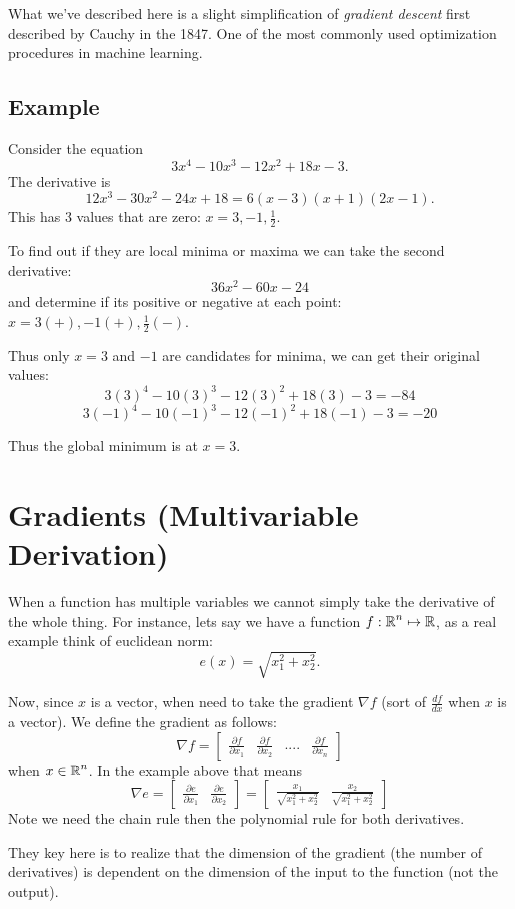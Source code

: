 What we've described here is a slight simplification of \emph{gradient descent} first described by Cauchy in the 1847. 
One of the most commonly used optimization procedures in machine learning. 

\subsection{Example}
Consider the equation \[3x^4-10x^3-12x^2+18x-3.\]
The derivative is \[12x^3-30x^2-24x+18=6(x-3)(x+1)(2x-1).\]
This has 3 values that are zero: $x=3,-1,\frac{1}{2}.$


To find out if they are local minima or maxima we can take the second derivative: 
\[36x^2-60x-24\] 
and determine if its positive or negative at each point: 
$x=3 (+),-1 (+),\frac{1}{2}(-).$

Thus only $x=3$ and $-1$ are candidates for minima, 
we can get their original values:
\[3(3)^4-10(3)^3-12(3)^2+18(3)-3=-84\]
\[3(-1)^4-10(-1)^3-12(-1)^2+18(-1)-3=-20\]

Thus the global minimum is at $x=3$.
\section{Gradients (Multivariable Derivation)}
When a function has multiple variables we cannot simply take the derivative of the whole thing. 
For instance, lets say we have a function $f:\operatorname{\mathbb{R}}^n\mapsto\operatorname{\mathbb{R}}$, 
as a real example think of euclidean norm: 
\[e(x) = \sqrt{x_1^2+x_2^2}.\]

Now, since $x$ is a vector, when need to take the gradient $\nabla f$ (sort of $\frac{df}{dx}$ when $x$ is a vector). 
We define the gradient as follows:
\[\nabla f = \begin{bmatrix}\frac{\partial f}{\partial x_1}&\frac{\partial f}{\partial x_2}&....&\frac{\partial f}{\partial x_n}\end{bmatrix}\]
when $x\in\operatorname{\mathbb{R}}^n$. 
In the example above that means 
\[\nabla e = \begin{bmatrix}\frac{\partial e}{\partial x_1}&\frac{\partial e}{\partial x_2}\end{bmatrix}= \begin{bmatrix}\frac{x_1}{ \sqrt{x_1^2+x_2^2}}&\frac{x_2}{\sqrt{x_1^2+x_2^2}}\end{bmatrix}\]
Note we need the chain rule then the polynomial rule for both derivatives. 

They key here is to realize that the dimension of the gradient (the number of derivatives) 
is dependent on the dimension of the input to the function (not the output).


